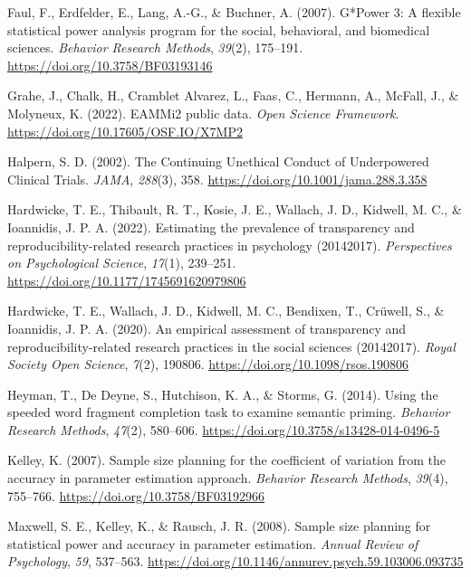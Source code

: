 \documentclass[
  man]{apa7}
\newlength{\cslhangindent}
\newlength{\cslentryspacingunit} %
\newenvironment{CSLReferences}[2] %
 {%
  \setlength{\parindent}{0pt}
  \ifodd #1
  \let\oldpar\par
  \def\par{\hangindent=\cslhangindent\oldpar}
  \fi
  \setlength{\parskip}{#2\cslentryspacingunit}
 }%
 {}
\begin{document}
\begin{CSLReferences}{1}{0}
\leavevmode{}%
Faul, F., Erdfelder, E., Lang, A.-G., \& Buchner, A. (2007). G*Power 3: A flexible statistical power analysis program for the social, behavioral, and biomedical sciences. \emph{Behavior Research Methods}, \emph{39}(2), 175--191. \url{https://doi.org/10.3758/BF03193146}

\leavevmode{}%
Grahe, J., Chalk, H., Cramblet Alvarez, L., Faas, C., Hermann, A., McFall, J., \& Molyneux, K. (2022). EAMMi2 public data. \emph{Open Science Framework}. \url{https://doi.org/10.17605/OSF.IO/X7MP2}

\leavevmode{}%
Halpern, S. D. (2002). The Continuing Unethical Conduct of Underpowered Clinical Trials. \emph{JAMA}, \emph{288}(3), 358. \url{https://doi.org/10.1001/jama.288.3.358}

\leavevmode{}%
Hardwicke, T. E., Thibault, R. T., Kosie, J. E., Wallach, J. D., Kidwell, M. C., \& Ioannidis, J. P. A. (2022). Estimating the prevalence of transparency and reproducibility-related research practices in psychology (2014{\textendash}2017). \emph{Perspectives on Psychological Science}, \emph{17}(1), 239--251. \url{https://doi.org/10.1177/1745691620979806}

\leavevmode{}%
Hardwicke, T. E., Wallach, J. D., Kidwell, M. C., Bendixen, T., Crüwell, S., \& Ioannidis, J. P. A. (2020). An empirical assessment of transparency and reproducibility-related research practices in the social sciences (2014{\textendash}2017). \emph{Royal Society Open Science}, \emph{7}(2), 190806. \url{https://doi.org/10.1098/rsos.190806}

\leavevmode{}%
Heyman, T., De Deyne, S., Hutchison, K. A., \& Storms, G. (2014). Using the speeded word fragment completion task to examine semantic priming. \emph{Behavior Research Methods}, \emph{47}(2), 580--606. \url{https://doi.org/10.3758/s13428-014-0496-5}

\leavevmode{}%
Kelley, K. (2007). Sample size planning for the coefficient of variation from the accuracy in parameter estimation approach. \emph{Behavior Research Methods}, \emph{39}(4), 755--766. \url{https://doi.org/10.3758/BF03192966}

\leavevmode{}%
Maxwell, S. E., Kelley, K., \& Rausch, J. R. (2008). Sample size planning for statistical power and accuracy in parameter estimation. \emph{Annual Review of Psychology}, \emph{59}, 537--563. \url{https://doi.org/10.1146/annurev.psych.59.103006.093735}


\end{CSLReferences}
\end{document}
